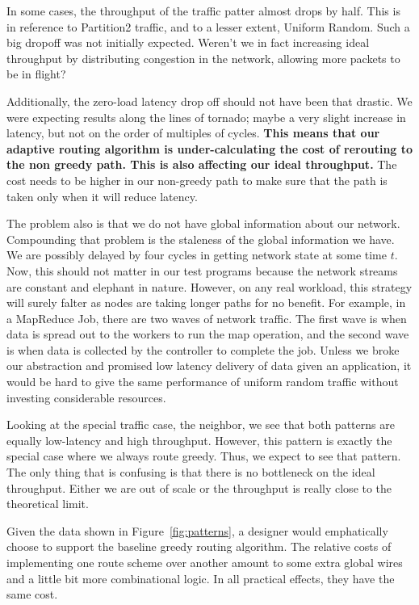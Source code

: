 \documentclass[10pt]{article}
\begin{document}
In some cases, the throughput of the traffic patter almost drops by half.
This is in reference to Partition2 traffic, 
and to a lesser extent, Uniform Random. 
Such a big dropoff was not initially expected. 
Weren't we in fact increasing ideal throughput by distributing congestion in 
the network, allowing more packets to be in flight? 

Additionally, the zero-load latency drop off should not have been that drastic.
We were expecting results along the lines of tornado; maybe a very slight
increase in latency, but not on the order of multiples of cycles. 
\textbf{This means that our adaptive routing algorithm is under-calculating 
the cost of rerouting to the non greedy path.
This is also affecting our ideal throughput.}
The cost needs to be higher in our non-greedy path to make sure that the path 
is taken only when it will reduce latency. \par

The problem also is that we do not have global information about our network.
Compounding that problem is the staleness of the global information we have.
We are possibly delayed by four cycles in getting network state at some time
$t$. 
Now, this should not matter in our test programs because the network streams
are constant and elephant in nature. 
However, on any real workload, this strategy will surely falter as nodes 
are taking longer paths for no benefit.
For example, in a MapReduce Job, there are two waves of network traffic.
The first wave is when data is spread out to the workers to run the map
operation, and the second wave is when data is collected by the controller
to complete the job. 
Unless we broke our abstraction and promised low latency delivery of data
given an application, it would be hard to give the same performance of 
uniform random traffic without investing considerable resources. \par

Looking at the special traffic case, the neighbor, we see that both 
patterns are equally low-latency and high throughput. 
However, this pattern is exactly the special case where we always 
route greedy. Thus, we expect to see that pattern.
The only thing that is confusing is that there is no bottleneck on the ideal
throughput.
Either we are out of scale or the throughput is really close to the theoretical
limit. \par

Given the data shown in Figure~\ref{fig:patterns}, a designer would
emphatically choose to support the baseline greedy routing algorithm.
The relative costs of implementing one route scheme over another amount to 
some extra global wires and a little bit more combinational logic. 
In all practical effects, they have the same cost. 
\end{document}
